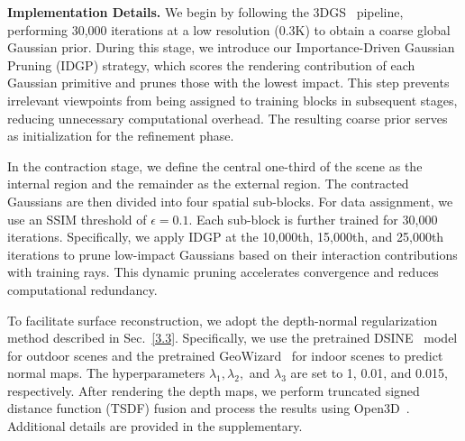 \noindent\textbf{Implementation Details.}
We begin by following the 3DGS~\cite{3dgs} pipeline, performing 30{,}000 iterations at a low resolution (0.3K) to obtain a coarse global Gaussian prior. During this stage, we introduce our Importance-Driven Gaussian Pruning (IDGP) strategy, which scores the rendering contribution of each Gaussian primitive and prunes those with the lowest impact. This step prevents irrelevant viewpoints from being assigned to training blocks in subsequent stages, reducing unnecessary computational overhead. The resulting coarse prior serves as initialization for the refinement phase.

In the contraction stage, we define the central one-third of the scene as the internal region and the remainder as the external region. The contracted Gaussians are then divided into four spatial sub-blocks. For data assignment, we use an SSIM threshold of $\epsilon = 0.1$. Each sub-block is further trained for 30{,}000 iterations. Specifically, we apply IDGP at the 10{,}000th, 15{,}000th, and 25{,}000th iterations to prune low-impact Gaussians based on their interaction contributions with training rays. This dynamic pruning accelerates convergence and reduces computational redundancy.



To facilitate surface reconstruction, we adopt the depth-normal regularization method described in Sec.~\ref{3.3}. Specifically, we use the pretrained DSINE~\cite{BaeD24} model for outdoor scenes and the pretrained GeoWizard~\cite{GeoWizard} for indoor scenes to predict normal maps. The hyperparameters $\lambda_1, \lambda_2,$ and $\lambda_3$ are set to 1, 0.01, and 0.015, respectively. After rendering the depth maps, we perform truncated signed distance function (TSDF) fusion and process the results using Open3D~\cite{Open3D}. 
Additional details are provided in the supplementary.



